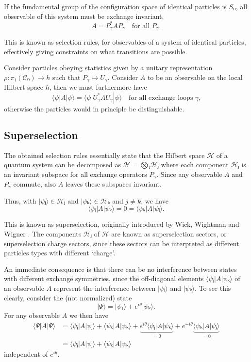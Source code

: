 \begin{lemma}
  If the fundamental group of the configuration space of identical particles is $Sₙ$, all observable of this system must be exchange invariant,
  \begin{equation}
    A = P_γ^*AP_γ\quad\text{for all $P_γ$}.
  \end{equation}
\end{lemma}

This is known as selection rules, for observables of a system of identical particles, effectively giving constraints on what transitions are possible.

Consider particles obeying statistics given by a unitary representation $ρ : π₁(𝒞ₙ) → h$ such that $P_γ ↦ U_γ$. Consider $A$ to be an observable on the local Hilbert space $h$, then we must furthermore have
\begin{equation}
  ⟨ψ|A|ψ⟩ = ⟨ψ|U_γ^*AU_γ|ψ⟩ \quad\text{for all exchange loops $γ$,}
\end{equation}
otherwise the particles would in principle be distinguishable.


\subsection{Superselection}

The obtained selection rules essentially state that the Hilbert space $ℋ$ of a quantum system can be decomposed as $ℋ = ⨂ⱼ ℋⱼ$ where each component $ℋⱼ$ is an invariant subspace for all exchange operators $P_γ$. Since any observable $A$ and $P_γ$ commute, also $A$ leaves these subspaces invariant.

Thus, with $|ψⱼ⟩ ∈ ℋⱼ$ and $|ψₖ⟩ ∈ ℋₖ$ and $j≠k$, we have
\begin{equation}
  ⟨ψⱼ|A|ψₖ⟩ = 0 = ⟨ψₖ|A|ψⱼ⟩.
\end{equation}

This is known as superselection, originally introduced by Wick, Wightman and Wigner \cite{wick-wightman-wigner}. The components $ℋⱼ$ of $ℋ$ are known as superselection sectors, or superselection charge sectors, since these sectors can be interpreted as different particles types with different `charge'.

An immediate consequence is that there can be no interference between states with different exchange symmetries, since the off-diagonal elements $⟨ψⱼ|A|ψₖ⟩$ of an observable $A$ represent the interference between $|ψⱼ⟩$ and $|ψₖ⟩$. To see this clearly, consider the (not normalized) state
\begin{equation}
  |Ψ⟩ = |ψ₁⟩ + e^{iθ}|ψₖ⟩.
\end{equation}
For any observable $A$ we then have
\begin{equation}
  \begin{aligned}
    ⟨Ψ|A|Ψ⟩
    &= ⟨ψⱼ|A|ψⱼ⟩ + ⟨ψₖ|A|ψₖ⟩ + \underbrace{e^{iθ}⟨ψⱼ|A|ψₖ⟩}_{=0} + e^{-iθ}\underbrace{⟨ψₖ|A|ψⱼ⟩}_{=0} \\
    &= ⟨ψⱼ|A|ψⱼ⟩ + ⟨ψₖ|A|ψₖ⟩
  \end{aligned}
\end{equation}
independent of $e^{iθ}$.

